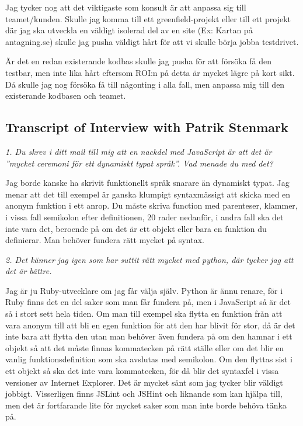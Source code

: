 \documentclass[11pt]{article}
\begin{document}
Jag tycker nog att det viktigaste som konsult är att anpassa sig till
teamet/kunden. Skulle jag komma till ett greenfield-projekt eller till ett
projekt där jag ska utveckla en väldigt isolerad del av en site (Ex:
Kartan på antagning.se) skulle jag pusha väldigt hårt för att vi skulle
börja jobba testdrivet.

Är det en redan existerande kodbas skulle jag pusha för att försöka få den
testbar, men inte lika hårt eftersom ROI:n på detta är mycket lägre på
kort sikt. Då skulle jag nog försöka få till någonting i alla fall, men
anpassa mig till den existerande kodbasen och teamet.

\subsection*{Transcript of Interview with Patrik Stenmark}

\emph{1. Du skrev i ditt mail till mig att en nackdel med JavaScript är att det är ”mycket ceremoni för ett dynamiskt typat språk”. Vad menade du med det?}

Jag borde kanske ha skrivit funktionellt språk snarare än dynamiskt typat. Jag menar att det till exempel är ganska klumpigt syntaxmässigt att skicka med en anonym funktion i ett anrop. Du måste skriva function med parenteser, klammer, i vissa fall semikolon efter definitionen, 20 rader nedanför, i andra fall ska det inte vara det, beroende på om det är ett objekt eller bara en funktion du definierar. Man behöver fundera rätt mycket på syntax.

\emph{2. Det känner jag igen som har suttit rätt mycket med python, där tycker jag att det är bättre.}

Jag är ju Ruby-utvecklare om jag får välja själv. Python är ännu renare, för i Ruby finns det en del saker som man får fundera på, men i JavaScript så är det så i stort sett hela tiden. Om man till exempel ska flytta en funktion från att vara anonym till att bli en egen funktion för att den har blivit för stor, då är det inte bara att flytta den utan man behöver även fundera på om den hamnar i ett objekt så att det måste finnas kommatecken på rätt ställe eller om det blir en vanlig funktionsdefinition som ska avslutas med semikolon. Om den flyttas sist i ett objekt så ska det inte vara kommatecken, för då blir det syntaxfel i vissa versioner av Internet Explorer. Det är mycket sånt som jag tycker blir väldigt jobbigt. Visserligen finns JSLint och JSHint och liknande som kan hjälpa till, men det är fortfarande lite för mycket saker som man inte borde behöva tänka på.
\end{document}
